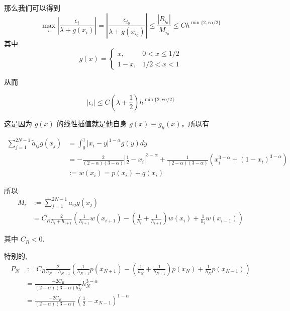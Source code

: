\documentclass{ctexart}
\begin{document}
那么我们可以得到
\begin{equation}
    \max_i |\frac{\epsilon_i}{\lambda+g(x_{i})}| = |\frac{\epsilon_{i_0}}{\lambda+g(x_{i_0})}| \le \frac{|R_{i_0}|}{M_{i_0}} \le C h^{\min\{2,r\alpha/2\}}
\end{equation}
其中
\begin{equation}
    g(x) = \begin{cases}
        x, & 0<x\le 1/2 \\ 1-x , & 1/2<x<1
    \end{cases}
\end{equation}

从而

\begin{equation}
    |\epsilon_i| \le C (\lambda+\frac{1}{2}) h^{\min\{2,r\alpha/2\}}
\end{equation}

这是因为 \(g(x)\) 的线性插值就是他自身 \(g(x)\equiv g_h(x)\)，所以有

\begin{equation}
    \begin{aligned}
        \sum_{j=1}^{2N-1} \tilde{a}_{ij} g(x_j) &
        = \int_{0}^1 |x_i-y|^{1-\alpha} g(y) dy   \\
        &= -\frac{2}{(2-\alpha)(3-\alpha)}|\frac{1}{2}-x_i|^{3-\alpha} + \frac{1}{(2-\alpha)(3-\alpha)}(x_i^{3-\alpha} + (1-x_i)^{3-\alpha})    \\
        & := w(x_i) = p(x_i) + q(x_i)
    \end{aligned}
\end{equation}

所以
\begin{equation}
    \begin{aligned}
        M_i &:= \sum_{j=1}^{2N-1} a_{ij} g(x_j) \\
        &= C_R\frac{2}{h_i + h_{i+1}}
        \left( \frac{1}{h_{i+1}} w(x_{i+1})
        - (\frac{1}{h_{i}}+\frac{1}{h_{i+1}}) w(x_{i})
        +  \frac{1}{h_{i}} w(x_{i-1}) \right)
    \end{aligned}
\end{equation}

其中 \(C_R < 0\).

特别的,
\begin{equation}
    \begin{aligned}
        P_N & := C_R \frac{2}{h_N + h_{N+1}}
        \left( \frac{1}{h_{N+1}} p(x_{N+1})
        - (\frac{1}{h_{N}}+\frac{1}{h_{N+1}}) p(x_{N})
        +  \frac{1}{h_{N}} p(x_{N-1}) \right) \\
        & = \frac{-2 C_R}{(2-\alpha)(3-\alpha) h_N^2} h_N^{3-\alpha} \\
        & = \frac{-2 C_R}{(2-\alpha)(3-\alpha)} (\frac{1}{2}-x_{N-1})^{1-\alpha} 
    \end{aligned}
\end{equation}
\end{document}
